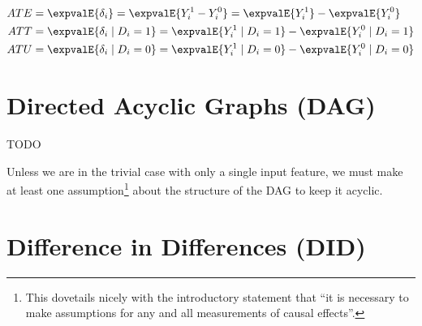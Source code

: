 \begin{subequations} \label{eq:causal_measures}
\begin{align}
ATE &= \expvalE{\delta_{i}} = \expvalE{Y_{i}^{1} - Y_{i}^{0}} = \expvalE{Y_{i}^{1}} - \expvalE{Y_{i}^{0}} \label{eq:causal_measures:ATE} \\
ATT &= \expvalE{\delta_{i} \mid D_{i} = 1} = \expvalE{Y_{i}^{1} \mid D_{i} = 1} - \expvalE{Y_{i}^{0} \mid D_{i} = 1} \label{eq:causal_measures:ATT} \\
ATU &= \expvalE{\delta_{i} \mid D_{i} = 0} = \expvalE{Y_{i}^{1} \mid D_{i} = 0} - \expvalE{Y_{i}^{0} \mid D_{i} = 0} \label{eq:causal_measures:ATU}
\end{align}
\end{subequations}

\section{Directed Acyclic Graphs (DAG)}
\label{causal_inference:DAG}
TODO

Unless we are in the trivial case with only a single input feature,
we must make at least one assumption\footnote{This
dovetails nicely with the introductory statement that
``it is necessary to make assumptions for any and all measurements of causal effects''.} about
the structure of the DAG to keep it acyclic.

\section{Difference in Differences (DID)}
\label{causal_inference:DID}

